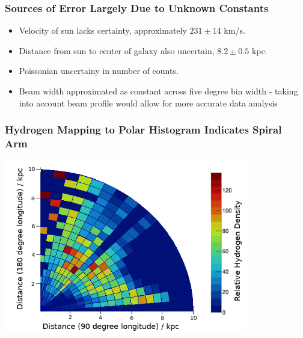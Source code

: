 \documentclass{beamer}
\begin{document}
\begin{frame}
  \frametitle{Sources of Error Largely Due to Unknown Constants}
  \begin{itemize}
    \item Velocity of sun lacks certainty, approximately $231 \pm 14$ km/s. 
      \pause
    \item Distance from sun to center of galaxy also uncertain, $8.2 \pm 0.5$ kpc. 
      \pause
    \item Poissonian uncertainy in number of counts.
      \pause
    \item Beam width approximated as constant across five degree bin width - taking into account beam profile would allow for more accurate data analysis
  \end{itemize}
\end{frame}

\begin{frame}
  \frametitle{Hydrogen Mapping to Polar Histogram Indicates Spiral Arm}
  \includegraphics[width=0.8\textwidth]{final.png}
\end{frame}
\end{document}
